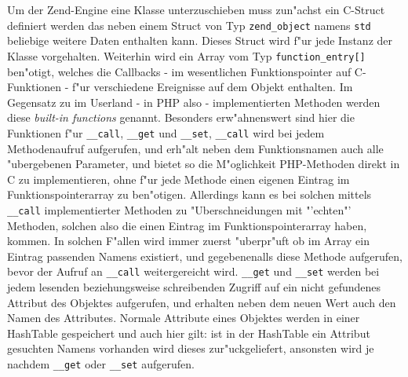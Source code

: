 Um der Zend-Engine eine Klasse unterzuschieben muss zun"achst ein C-Struct definiert werden das neben einem Struct von Typ
\texttt{zend\_object} namens \texttt{std} beliebige weitere Daten enthalten kann. Dieses Struct wird f"ur jede Instanz der Klasse
vorgehalten. Weiterhin wird ein Array vom Typ \texttt{function\_entry[]} ben"otigt, welches die Callbacks - im wesentlichen Funktionspointer
auf C-Funktionen - f"ur verschiedene Ereignisse auf dem Objekt enthalten. Im Gegensatz zu im Userland - in PHP also - implementierten
Methoden werden diese \emph{built-in functions} genannt.
Besonders erw"ahnenswert sind hier die Funktionen f"ur 
\texttt{\_\_call}, \texttt{\_\_get} und \texttt{\_\_set}, \texttt{\_\_call} wird bei jedem Methodenaufruf aufgerufen, und erh"alt neben dem
Funktionsnamen auch alle "ubergebenen Parameter, und bietet so die M"oglichkeit PHP-Methoden direkt in C zu implementieren, ohne f"ur jede
Methode einen eigenen Eintrag im Funktionspointerarray zu ben"otigen. Allerdings kann es bei solchen mittels \texttt{\_\_call} implementierter
Methoden zu "Uberschneidungen mit "'echten"' Methoden, solchen also die einen Eintrag im Funktionspointerarray haben, kommen. In solchen
F"allen wird immer zuerst "uberpr"uft ob im Array ein Eintrag passenden Namens existiert, und gegebenenalls diese Methode aufgerufen, bevor
der Aufruf an  \texttt{\_\_call} weitergereicht wird.
\texttt{\_\_get} und \texttt{\_\_set} werden bei jedem lesenden beziehungsweise schreibenden Zugriff auf ein nicht gefundenes Attribut des
Objektes aufgerufen, und erhalten neben dem neuen Wert auch den Namen des Attributes. Normale Attribute eines Objektes werden in einer
HashTable gespeichert und auch hier gilt: ist in der HashTable ein Attribut gesuchten Namens vorhanden wird dieses zur"uckgeliefert,
ansonsten wird je nachdem \texttt{\_\_get} oder \texttt{\_\_set} aufgerufen.

